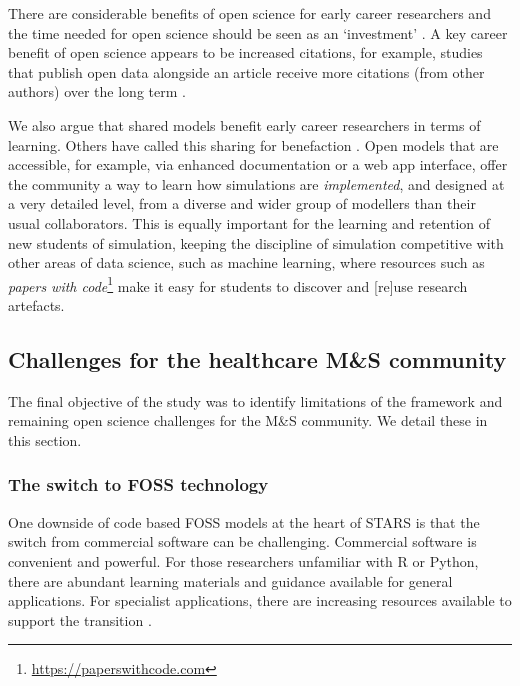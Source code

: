 \documentclass[]{interact}
\theoremstyle{plain}%
\theoremstyle{definition}
\theoremstyle{remark}
\begin{document}
There are considerable benefits of open science for early career researchers and the time needed for open science should be seen as an `investment' \citep{Allen2019, mckiernan2016open}. A key career benefit of open science appears to be increased citations, for example, studies that publish open data alongside an article receive more citations (from other authors) over the long term \citep{piwowar2013data, mckiernan2016open}.  

We also argue that shared models benefit early career researchers in terms of learning. Others have called this sharing for benefaction \citep{Collberg_2016}. Open models that are accessible, for example, via enhanced documentation or a web app interface, offer the community a way to learn how simulations are \textit{implemented}, and designed at a very detailed level, from a diverse and wider group of modellers than their usual collaborators. This is equally important for the learning and retention of new students of simulation, keeping the discipline of simulation competitive with other areas of data science, such as machine learning, where resources such as \textit{papers with code}\footnote{\url{https://paperswithcode.com}} make it easy for students to discover and [re]use research artefacts. 

\subsection{Challenges for the healthcare M\&S community}

The final objective of the study was to identify limitations of the framework and remaining open science challenges for the M\&S community.  We detail these in this section.

\subsubsection{The switch to FOSS technology}

One downside of code based FOSS models at the heart of STARS is that the switch from commercial software can be challenging. Commercial software is convenient and powerful. For those researchers unfamiliar with R or Python, there are abundant learning materials and guidance available for general applications. For specialist applications, there are increasing resources available to support the transition \citep{harper_monks_2023_framework, knight2022applied, shiney_paper, wojciechowski2015interactive, tom_monks_2023_8101984, alison_harper_2023_8011462}. 
\end{document}

